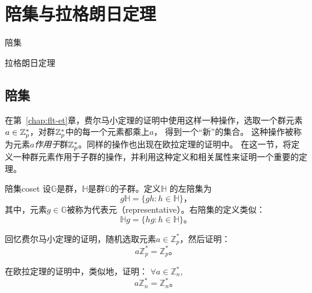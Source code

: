 %

\chapter{陪集与拉格朗日定理}
\label{chap:coset} %

\begin{introduction}
  \item 陪集
  \item 拉格朗日定理
  
\end{introduction}
 \section{陪集}
 \label{sec:coset}
 在第~\ref{chap:flt-et}章，费尔马小定理的证明中使用这样一种操作，选取一个群元素$a\in {\mathbb Z}_p^*$，对群${\mathbb Z}_p^*$中的每一个元素都乘上$a$，
 得到一个“新”的集合。 这种操作被称为元素$a$\emph{作用于}群${\mathbb Z}_p^*$。同样的操作也出现在欧拉定理的证明中。
 在这一节，将定义一种群元素作用于子群的操作，并利用这种定义和相关属性来证明一个重要的定理。
  
 	\begin{definition}{陪集}{coset}
 		设$\mathbb{G}$是群，$\mathbb{H}$是群$\mathbb{G}$的子群。定义$\mathbb{H}$ 的左陪集为
 		\[g\mathbb{H} = \{gh: h \in \mathbb{H}\}\text{，}\]
 		其中，元素$g\in \mathbb{G}$被称为代表元（representative）。右陪集的定义类似：
 	    \[\mathbb{H}g = \{hg: h \in \mathbb{H}\}\text{。}\]
 	\end{definition}
 
 \begin{example}
 		回忆费尔马小定理的证明，随机选取元素$a \in \mathbb{Z}_p^*$，然后证明： 
 		\[a \mathbb{Z}_p^* = \mathbb{Z}_p^*\text{。}\]
 		
 在欧拉定理的证明中，类似地，证明：
 		$\forall a \in \mathbb{Z}_n^*$, \[a \mathbb{Z}_n^* = \mathbb{Z}_n^*\text{。}\]
 \end{example}
 
